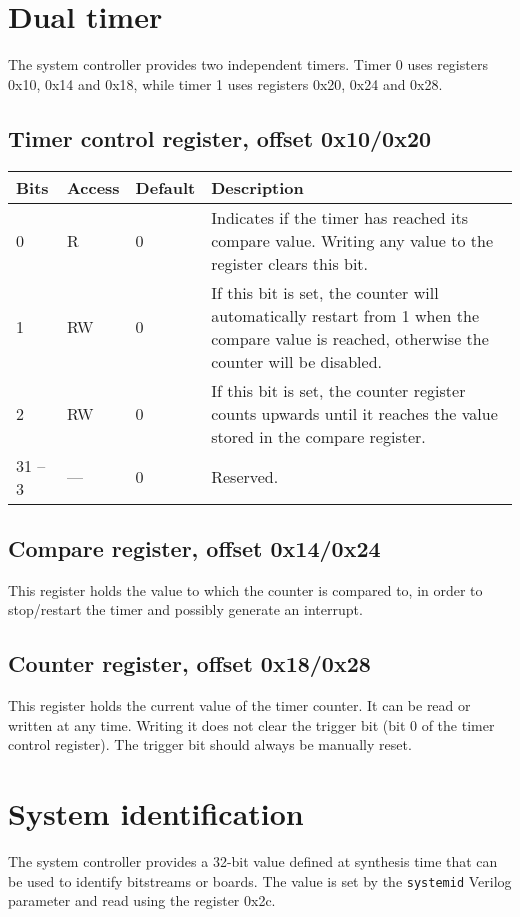 \documentclass[a4paper,11pt]{article}
\begin{document}
\section{Dual timer}
The system controller provides two independent timers. Timer 0 uses registers 0x10, 0x14 and 0x18, while timer 1 uses registers 0x20, 0x24 and 0x28.

\subsection{Timer control register, offset 0x10/0x20}
\begin{tabularx}{\textwidth}{|l|l|l|X|}
\hline
\bf Bits & \bf Access & \bf Default & \bf Description \\
\hline
0 & R & 0 & Indicates if the timer has reached its compare value. Writing any value to the register clears this bit. \\
\hline
1 & RW & 0 & If this bit is set, the counter will automatically restart from 1 when the compare value is reached, otherwise the counter will be disabled. \\
\hline
2 & RW & 0 & If this bit is set, the counter register counts upwards until it reaches the value stored in the compare register. \\
\hline
31 -- 3 & --- & 0 & Reserved. \\
\hline
\end{tabularx}

\subsection{Compare register, offset 0x14/0x24}
This register holds the value to which the counter is compared to, in order to stop/restart the timer and possibly generate an interrupt.

\subsection{Counter register, offset 0x18/0x28}
This register holds the current value of the timer counter. It can be read or written at any time.
Writing it does not clear the trigger bit (bit 0 of the timer control register). The trigger bit should always be manually reset.

\section{System identification}
The system controller provides a 32-bit value defined at synthesis time that can be used to identify bitstreams or boards. The value is set by the \verb!systemid! Verilog parameter and read using the register 0x2c.
\end{document}
